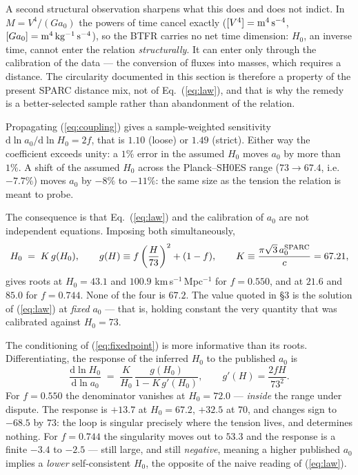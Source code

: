 \documentclass[11pt,a4paper]{article}
\begin{document}
A second structural observation sharpens what this does and does not
indict. In $M = V^4/(G a_0)$ the powers of time cancel exactly
($[V^4] = \rm m^4\,s^{-4}$, $[G a_0] = \rm m^4\,kg^{-1}\,s^{-4}$), so the
BTFR carries no net time dimension: $H_0$, an inverse time, cannot enter the
relation \emph{structurally}. It can enter only through the calibration of
the data --- the conversion of fluxes into masses, which requires a
distance. The circularity documented in this section is therefore a property
of the present SPARC distance mix, not of Eq.~(\ref{eq:law}), and that is
why the remedy is a better-selected sample rather than abandonment of the
relation.

Propagating (\ref{eq:coupling}) gives a sample-weighted sensitivity
$\mathrm{d}\ln a_0 / \mathrm{d}\ln H_0 = 2f$, that is $1.10$ (loose) or
$1.49$ (strict). Either way the coefficient exceeds unity: a $1\%$ error in
the assumed $H_0$ moves $a_0$ by more than $1\%$. A shift of the assumed
$H_0$ across the Planck--SH0ES range ($73 \to 67.4$, i.e.\ $-7.7\%$) moves
$a_0$ by $-8\%$ to $-11\%$: the same size as the tension the relation is
meant to probe.

The consequence is that Eq.~(\ref{eq:law}) and the calibration of $a_0$ are
not independent equations. Imposing both simultaneously,
\begin{equation}
H_0 \;=\; K\,g(H_0), \qquad
g(H) \equiv f\left(\frac{H}{73}\right)^{2} + (1-f), \qquad
K \equiv \frac{\pi\sqrt{3}\,a_0^{\rm SPARC}}{c} = 67.21,
\label{eq:fixedpoint}
\end{equation}
gives roots at $H_0 = 43.1$ and $100.9$ km\,s$^{-1}$\,Mpc$^{-1}$ for
$f = 0.550$, and at $21.6$ and $85.0$ for $f = 0.744$. None of the four is
$67.2$. The value quoted in \S3 is the solution of (\ref{eq:law}) at
\emph{fixed} $a_0$ --- that is, holding constant the very quantity that was
calibrated against $H_0 = 73$.

The conditioning of (\ref{eq:fixedpoint}) is more informative than its
roots. Differentiating, the response of the inferred $H_0$ to the published
$a_0$ is
\begin{equation}
\frac{\mathrm{d}\ln H_0}{\mathrm{d}\ln a_0}
\;=\; \frac{K}{H_0}\,\frac{g(H_0)}{1 - K\,g'(H_0)},
\qquad g'(H) = \frac{2fH}{73^2}.
\label{eq:conditioning}
\end{equation}
For $f = 0.550$ the denominator vanishes at $H_0 = 72.0$ --- \emph{inside}
the range under dispute. The response is $+13.7$ at $H_0 = 67.2$, $+32.5$ at
$70$, and changes sign to $-68.5$ by $73$: the loop is singular precisely
where the tension lives, and determines nothing. For $f = 0.744$ the
singularity moves out to $53.3$ and the response is a finite $-3.4$ to
$-2.5$ --- still large, and still \emph{negative}, meaning a higher
published $a_0$ implies a \emph{lower} self-consistent $H_0$, the opposite
of the naive reading of (\ref{eq:law}).
\end{document}
